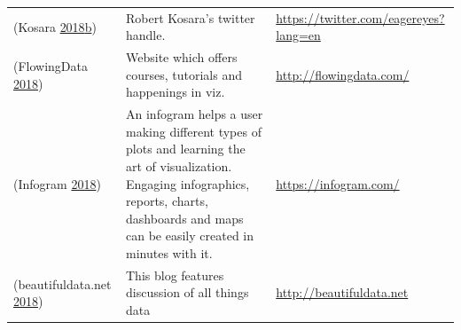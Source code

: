 \documentclass[]{book}
\begin{document}
\begin{longtable}[]{@{}lll@{}}
\begin{minipage}[t]{0.15\columnwidth}\raggedright\strut
(Kosara
\protect\hyperlink{ref-twitter_Kosara}{2018}\protect\hyperlink{ref-twitter_Kosara}{b})\strut
\end{minipage} & \begin{minipage}[t]{0.28\columnwidth}\raggedright\strut
Robert Kosara's twitter handle.\strut
\end{minipage} & \begin{minipage}[t]{0.48\columnwidth}\raggedright\strut
\url{https://twitter.com/eagereyes?lang=en}\strut
\end{minipage}\tabularnewline
\begin{minipage}[t]{0.15\columnwidth}\raggedright\strut
(FlowingData \protect\hyperlink{ref-flowingdata}{2018})\strut
\end{minipage} & \begin{minipage}[t]{0.28\columnwidth}\raggedright\strut
Website which offers courses, tutorials and happenings in viz.\strut
\end{minipage} & \begin{minipage}[t]{0.48\columnwidth}\raggedright\strut
\url{http://flowingdata.com/}\strut
\end{minipage}\tabularnewline
\begin{minipage}[t]{0.15\columnwidth}\raggedright\strut
(Infogram \protect\hyperlink{ref-infogram}{2018})\strut
\end{minipage} & \begin{minipage}[t]{0.28\columnwidth}\raggedright\strut
An infogram helps a user making different types of plots and learning
the art of visualization. Engaging infographics, reports, charts,
dashboards and maps can be easily created in minutes with it.\strut
\end{minipage} & \begin{minipage}[t]{0.48\columnwidth}\raggedright\strut
\url{https://infogram.com/}\strut
\end{minipage}\tabularnewline
\begin{minipage}[t]{0.15\columnwidth}\raggedright\strut
(beautifuldata.net \protect\hyperlink{ref-data_beaut}{2018})\strut
\end{minipage} & \begin{minipage}[t]{0.28\columnwidth}\raggedright\strut
This blog features discussion of all things data\strut
\end{minipage} & \begin{minipage}[t]{0.48\columnwidth}\raggedright\strut
\url{http://beautifuldata.net}\strut

\end{minipage}
\end{longtable}
\end{document}
